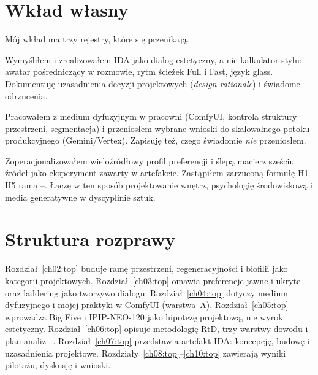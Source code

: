 \section{Wkład własny}
\label{ch01:sec:wklad}

Mój wkład ma trzy rejestry, które się przenikają.

\begin{description}[style=nextline]
  \item[Projektowy]
  Wymyśliłem i zrealizowałem IDA jako dialog estetyczny, a nie kalkulator stylu: awatar pośredniczący w rozmowie, rytm ścieżek Full i Fast, język glass. Dokumentuję uzasadnienia decyzji projektowych (\emph{design rationale}) i świadome odrzucenia.

  \item[Medialny]
  Pracowałem z medium dyfuzyjnym w pracowni (ComfyUI, kontrola struktury przestrzeni, segmentacja) i przeniosłem wybrane wnioski do skalowalnego potoku produkcyjnego (Gemini/Vertex). Zapisuję też, czego świadomie \emph{nie} przeniosłem.

  \item[Badawczy]
  Zoperacjonalizowałem wieloźródłowy profil preferencji i ślepą macierz sześciu źródeł jako eksperyment zawarty w artefakcie. Zastąpiłem zarzuconą formułę H1--H5 ramą --. Łączę w ten sposób projektowanie wnętrz, psychologię środowiskową i media generatywne w dyscyplinie sztuk.
\end{description}

\section{Struktura rozprawy}
\label{ch01:sec:struktura}

Rozdział~\ref{ch02:top} buduje ramę przestrzeni, regeneracyjności i biofilii jako kategorii projektowych.
Rozdział~\ref{ch03:top} omawia preferencje jawne i ukryte oraz laddering jako tworzywo dialogu.
Rozdział~\ref{ch04:top} dotyczy medium dyfuzyjnego i mojej praktyki w ComfyUI (warstwa~A).
Rozdział~\ref{ch05:top} wprowadza Big Five i IPIP-NEO-120 jako hipotezę projektową, nie wyrok estetyczny.
Rozdział~\ref{ch06:top} opisuje metodologię RtD, trzy warstwy dowodu i plan analiz --.
Rozdział~\ref{ch07:top} przedstawia artefakt IDA: koncepcję, budowę i uzasadnienia projektowe.
Rozdziały~\ref{ch08:top}--\ref{ch10:top} zawierają wyniki pilotażu, dyskusję i wnioski.
